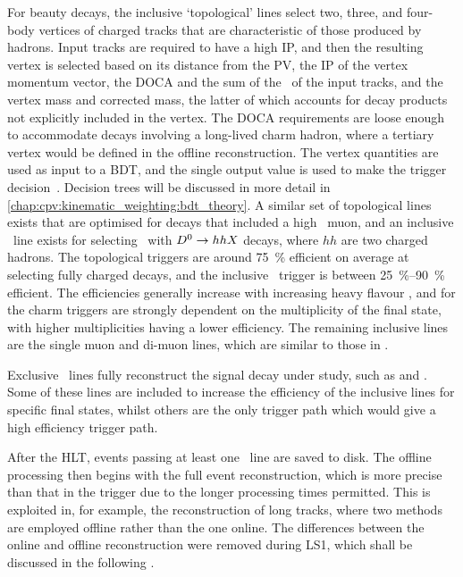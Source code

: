 For beauty decays, the inclusive `topological' lines select two, three, and 
four-body vertices of charged tracks that are characteristic of those produced 
by \PB hadrons.
Input tracks are required to have a high \ac{IP}, and then the resulting vertex 
is selected based on its distance from the \ac{PV}, the \ac{IP} of the vertex 
momentum vector, the \ac{DOCA} and the sum of the \pT\ of the input tracks, and 
the vertex mass and corrected mass, the latter of which accounts for decay 
products not explicitly included in the vertex.
The \ac{DOCA} requirements are loose enough to accommodate \PB decays involving 
a long-lived charm hadron, where a tertiary vertex would be defined in the 
offline reconstruction.
The vertex quantities are used as input to a \ac{BDT}, and the single output 
value is used to make the trigger 
decision~\cite{Gligorov:2011qxa,Gligorov:1384380}.
Decision trees will be discussed in more detail in 
\cref{chap:cpv:kinematic_weighting:bdt_theory}.
A similar set of topological lines exists that are optimised for \PB decays 
that included a high \pT\ muon, and an inclusive \PDstarp\ line exists for 
selecting \DstToDzpi\ with $D^{0} \to hhX$ decays, where $hh$ are two 
charged hadrons.
The topological \PB triggers are around \SI{75}{\percent} efficient on average 
at selecting fully charged \PB decays, and the inclusive \PDstarp\ trigger is 
between \SIrange{25}{90}{\percent} efficient.
The efficiencies generally increase with increasing heavy flavour \pT, and for 
the charm triggers are strongly dependent on the multiplicity of the final 
state, with higher multiplicities having a lower efficiency.
The remaining inclusive lines are the single muon and di-muon lines, which are 
similar to those in \hltone.

Exclusive \hlttwo\ lines fully reconstruct the signal decay under study, such 
as \decay{\PB}{\pimpip} and \decay{\PLambdac}{\Pproton\PKminus\Ppiplus}.
Some of these lines are included to increase the efficiency of the inclusive 
lines for specific final states, whilst others are the only trigger path which 
would give a high efficiency trigger path.

After the \acl{HLT}, events passing at least one \hlttwo\ line are saved to 
disk.
The offline processing then begins with the full event reconstruction, which is 
more precise than that in the trigger due to the longer processing times 
permitted.
This is exploited in, for example, the reconstruction of long tracks, where two 
methods are employed offline rather than the one online.
The differences between the online and offline reconstruction were removed 
during \ac{LS1}, which shall be discussed in the following 
.

